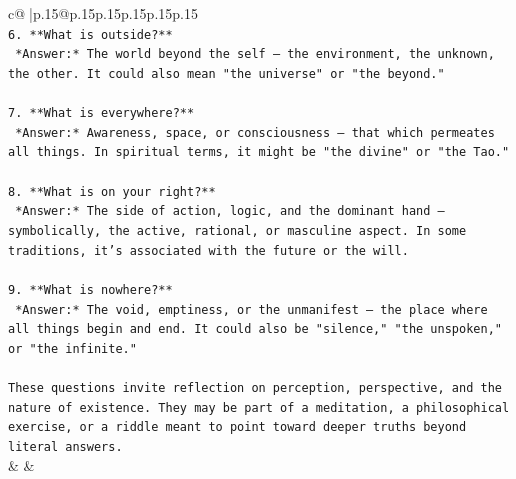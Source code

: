 \documentclass{article}
\begin{document}
{\begin{supertabular}{c@{$\;$}|p{.15\linewidth}@{}p{.15\linewidth}p{.15\linewidth}p{.15\linewidth}p{.15\linewidth}p{.15\linewidth}}
{{{\\ 
\texttt{6. **What is outside?**  } \\
\texttt{   *Answer:* The world beyond the self — the environment, the unknown, the other. It could also mean "the universe" or "the beyond."} \\
\\ 
\texttt{7. **What is everywhere?**  } \\
\texttt{   *Answer:* Awareness, space, or consciousness — that which permeates all things. In spiritual terms, it might be "the divine" or "the Tao."} \\
\\ 
\texttt{8. **What is on your right?**  } \\
\texttt{   *Answer:* The side of action, logic, and the dominant hand — symbolically, the active, rational, or masculine aspect. In some traditions, it's associated with the future or the will.} \\
\\ 
\texttt{9. **What is nowhere?**  } \\
\texttt{   *Answer:* The void, emptiness, or the unmanifest — the place where all things begin and end. It could also be "silence," "the unspoken," or "the infinite."} \\
\\ 
\texttt{These questions invite reflection on perception, perspective, and the nature of existence. They may be part of a meditation, a philosophical exercise, or a riddle meant to point toward deeper truths beyond literal answers.} \\
            }
        }
    }
    & & \\ \\


\end{supertabular}}
\end{document}
